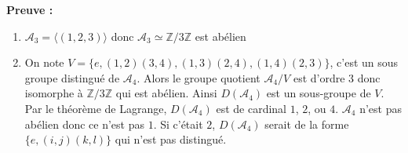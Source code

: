 \documentclass{report}
\newenvironment{preuve}{\begin{tcolorbox}[colframe= white]
    \textbf{Preuve :}
\par }
    {\end{tcolorbox}}
\newcommand{\Z}{\mathbb{Z}}
\begin{document}
\begin{preuve}
\begin{enumerate}
\item $\mathcal{A}_3 = \langle (1,2,3) \rangle$ donc $\mathcal{A}_3\simeq \Z/3\Z$ est abélien
\item On note $V = \{e,(1,2)(3,4),(1,3)(2,4),(1,4)(2,3)\}$, c'est un sous groupe distingué de $\mathcal{A}_4$. Alors le groupe quotient $\mathcal{A}_4/V$ est d'ordre 3 donc isomorphe à $\Z/3\Z$ qui est abélien. Ainsi $D(\mathcal{A}_4)$ est un sous-groupe de $V$. Par le théorème de Lagrange, $D(\mathcal{A}_4)$ est de cardinal $1$, $2$, ou $4$. $\mathcal{A}_4$ n'est pas abélien donc ce n'est pas $1$. Si c'était $2$, $D(\mathcal{A}_4)$ serait de la forme $\{e, (i,j)(k,l)\}$ qui n'est pas distingué.
\end{enumerate}
\end{preuve}
\end{document}
